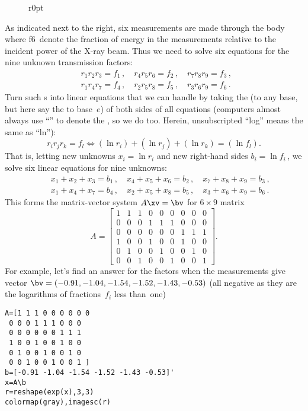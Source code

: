 \begin{example}
\begin{wrapfigure}[8]r{0pt}  \end{wrapfigure}
As indicated next to the right, six  measurements are made through the body where \hlist f6\ denote the fraction of energy in the measurements relative to the incident power of the X-ray beam.
Thus we need to solve six equations for the nine unknown transmission factors:
\begin{eqnarray*}
&&
r_1r_2r_3=f_1\,,\quad
r_4r_5r_6=f_2\,,\quad
r_7r_8r_9=f_3\,,\quad
\\&&
r_1r_4r_7=f_4\,,\quad
r_2r_5r_8=f_5\,,\quad
r_3r_6r_9=f_6\,.\quad
\end{eqnarray*}
Turn such s into linear equations that we can handle by taking the  (to any base, but here say the  to base~\(e\)) of both sides of all equations
(computers almost always use ``'' to denote the , so we do too.  Herein, unsubscripted ``log'' means the same as ``ln''):
\begin{equation*}
r_ir_jr_k=f_l \iff (\ln r_i)+(\ln r_j)+(\ln r_k)=(\ln f_l).
\end{equation*}
That is, letting new unknowns \(x_i=\ln r_i\) and new right-hand sides \(b_i=\ln f_i\)\,, we solve six linear equations for nine unknowns:
\begin{eqnarray*}&&
x_1+x_2+x_3=b_1\,,\quad
x_4+x_5+x_6=b_2\,,\quad
x_7+x_8+x_9=b_3\,,
\\&&
x_1+x_4+x_7=b_4\,,\quad
x_2+x_5+x_8=b_5\,,\quad
x_3+x_6+x_9=b_6\,.
\end{eqnarray*}
This forms the matrix-vector system \(A\xv=\bv\) for \(6\times9\) matrix
\begin{equation*}
A=\begin{bmatrix} 
 1&1&1&0&0&0&0&0&0 \\
 0&0&0&1&1&1&0&0&0 \\
 0&0&0&0&0&0&1&1&1 \\
 1&0&0&1&0&0&1&0&0 \\
 0&1&0&0&1&0&0&1&0 \\
 0&0&1&0&0&1&0&0&1 \end{bmatrix}.
\end{equation*}
For example, let's find an answer for the factors when the measurements give vector \(\sloppy\bv=(-0.91, -1.04, -1.54, -1.52, -1.43, -0.53)\) (all negative as they are the logarithms of fractions~\(f_i\) less than~one)
\setbox\ajrqrbox\hbox{}%
\marginajrbox%
\begin{verbatim}
A=[1 1 1 0 0 0 0 0 0 
 0 0 0 1 1 1 0 0 0 
 0 0 0 0 0 0 1 1 1
 1 0 0 1 0 0 1 0 0 
 0 1 0 0 1 0 0 1 0 
 0 0 1 0 0 1 0 0 1 ]
b=[-0.91 -1.04 -1.54 -1.52 -1.43 -0.53]'
x=A\b
r=reshape(exp(x),3,3)
colormap(gray),imagesc(r)
\end{verbatim}


\end{example}
